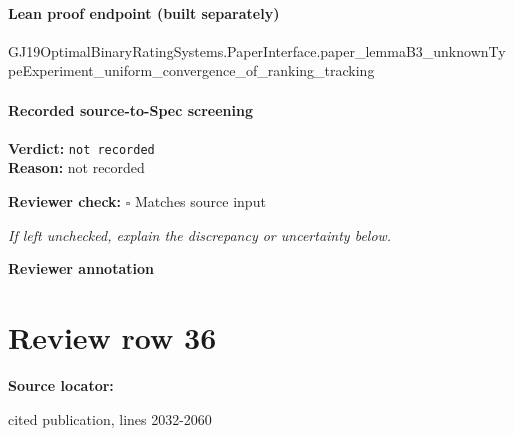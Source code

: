 \documentclass[10pt]{article}
\newcommand{\reviewerbox}{%
  \par\noindent\fbox{\parbox{0.96\linewidth}{\rule{0pt}{0.38in}}}\par
}
\newcommand{\reviewmatch}[1]{%
  \par\noindent\textbf{Reviewer check:} $\square$\; #1\par
  \noindent\emph{If left unchecked, explain the discrepancy or uncertainty below.}\par
}
\begin{document}
\paragraph{Lean proof endpoint (built separately)}\begin{ReviewVerbatim}
GJ19OptimalBinaryRatingSystems.PaperInterface.paper_lemmaB3_unknownTypeExperiment_uniform_convergence_of_ranking_tracking
\end{ReviewVerbatim}

\paragraph{Recorded source-to-Spec screening}
\textbf{Verdict:} \texttt{not recorded}
\\
\textbf{Reason:} not recorded
\reviewmatch{Matches source input}
\noindent\textbf{Reviewer annotation}\par
\reviewerbox
\clearpage
\hypertarget{source-claim-99b64aa08841b772}{}
\section*{Review row 36}
\textbf{Source locator:} {\footnotesize\raggedright cited publication, lines 2032-\allowbreak{}2060\par}
\end{document}
